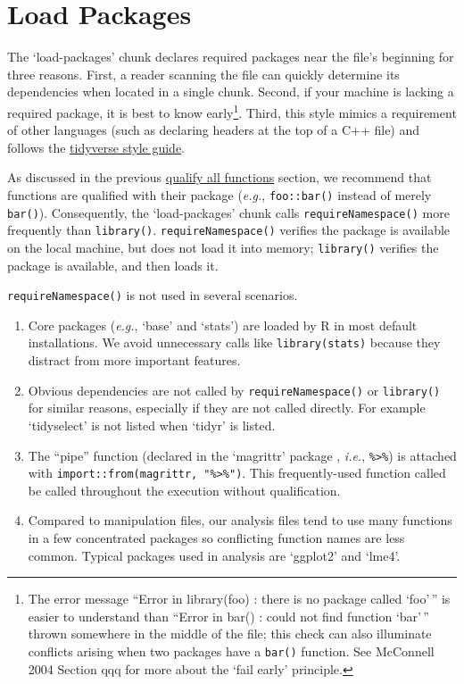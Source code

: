 \documentclass[
]{book}
\providecommand{\tightlist}{%
  \setlength{\itemsep}{0pt}\setlength{\parskip}{0pt}}
\begin{document}
\hypertarget{chunk-load-packages}{%
\section{Load Packages}\label{chunk-load-packages}}

The `load-packages' chunk declares required packages near the file's beginning for three reasons. First, a reader scanning the file can quickly determine its dependencies when located in a single chunk. Second, if your machine is lacking a required package, it is best to know early\footnote{The error message ``Error in library(foo) : there is no package called `foo'\,'' is easier to understand than ``Error in bar() : could not find function `bar'\,'' thrown somewhere in the middle of the file; this check can also illuminate conflicts arising when two packages have a \texttt{bar()} function. See McConnell 2004 Section qqq for more about the `fail early' principle.}. Third, this style mimics a requirement of other languages (such as declaring headers at the top of a C++ file) and follows the \href{https://style.tidyverse.org/files.html\#internal-structure}{tidyverse style guide}.

As discussed in the previous \protect\hyperlink{qualify-functions}{qualify all functions} section, we recommend that functions are qualified with their package (\emph{e.g.}, \texttt{foo::bar()} instead of merely \texttt{bar()}). Consequently, the `load-packages' chunk calls \texttt{requireNamespace()} more frequently than \texttt{library()}. \texttt{requireNamespace()} verifies the package is available on the local machine, but does not load it into memory; \texttt{library()} verifies the package is available, and then loads it.

\texttt{requireNamespace()} is not used in several scenarios.

\begin{enumerate}
\def\labelenumi{\arabic{enumi}.}
\tightlist
\item
  Core packages (\emph{e.g.}, `base' and `stats') are loaded by R in most default installations. We avoid unnecessary calls like \texttt{library(stats)} because they distract from more important features.
\item
  Obvious dependencies are not called by \texttt{requireNamespace()} or \texttt{library()} for similar reasons, especially if they are not called directly. For example `tidyselect' is not listed when `tidyr' is listed.
\item
  The ``pipe'' function (declared in the `magrittr' package , \emph{i.e.}, \texttt{\%\textgreater{}\%}) is attached with \texttt{import::from(magrittr,\ "\%\textgreater{}\%")}. This frequently-used function called be called throughout the execution without qualification.
\item
  Compared to manipulation files, our analysis files tend to use many functions in a few concentrated packages so conflicting function names are less common. Typical packages used in analysis are `ggplot2' and `lme4'.
\end{enumerate}
\end{document}
